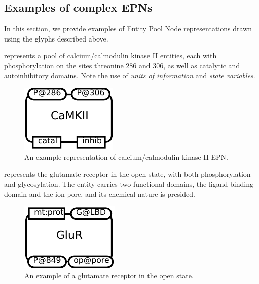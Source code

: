 
\subsection{Examples of complex EPNs}
\label{sec:CplxEPNs}

In this section, we provide examples of Entity Pool Node representations drawn using the \SBGNPDLone glyphs described above. 

 represents a pool of calcium/calmodulin kinase II entities, each with phosphorylation on the sites threonine 286 and 306, as well as catalytic and autoinhibitory domains.  Note the use of \emph{units of information} and \emph{state variables}.

\begin{figure}[H]
  \centering
  \includegraphics[scale = 0.8]{images/build/macromolecule_camkii_example.pdf}
  \caption{An example representation of calcium/calmodulin kinase II EPN.}
  \label{fig:example-camkii}
\end{figure}

 represents the glutamate receptor in the open state, with both phosphorylation and glycosylation.  The entity carries two functional domains, the ligand-binding domain and the ion pore, and its chemical nature is presided.

\begin{figure}[H]
  \centering
  \includegraphics[scale = 0.8]{images/build/macromolecule_glu_r_example.pdf}
  \caption{An example of a glutamate receptor in the open state.}
  \label{fig:example-glur}
\end{figure}

